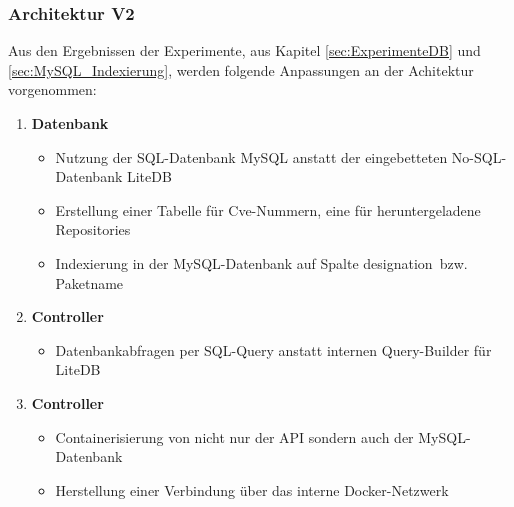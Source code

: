 \subsubsection{Architektur V2} \label{sec:Architektur}
    Aus den Ergebnissen der Experimente, aus Kapitel \ref{sec:ExperimenteDB} und \ref{sec:MySQL_Indexierung}, werden folgende Anpassungen an der Achitektur vorgenommen:
    \begin{enumerate}
        \item \textbf{Datenbank}
            \begin{itemize}
                \item Nutzung der SQL-Datenbank MySQL anstatt der eingebetteten No-SQL-Datenbank LiteDB
                \item Erstellung einer Tabelle für Cve-Nummern, eine für heruntergeladene Repositories
                \item Indexierung in der MySQL-Datenbank auf Spalte \glqq designation\grqq~bzw. Paketname
            \end{itemize}
        \item \textbf{Controller}
            \begin{itemize}
                \item Datenbankabfragen per SQL-Query anstatt internen Query-Builder für LiteDB
            \end{itemize}
        \item \textbf{Controller}
            \begin{itemize}
                \item Containerisierung von nicht nur der API sondern auch der MySQL-Datenbank
                \item Herstellung einer Verbindung über das interne Docker-Netzwerk
            \end{itemize}
    \end{enumerate}